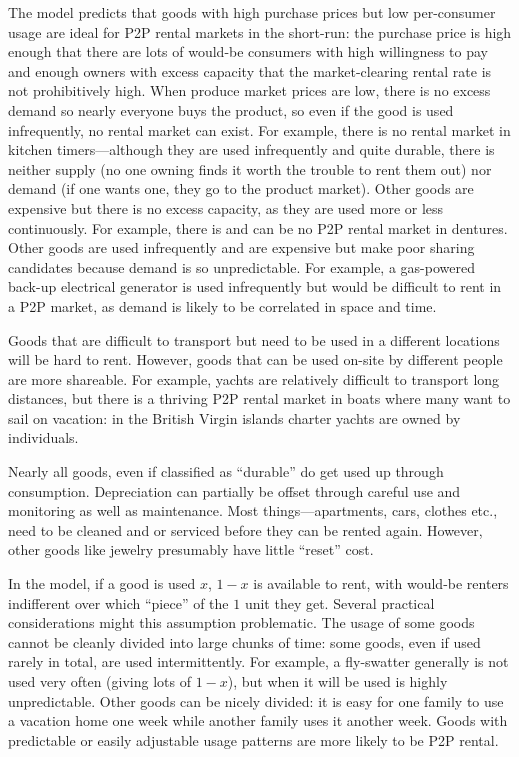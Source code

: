 \documentclass[11pt]{article}
\begin{document}
The model predicts that goods with high purchase prices but low per-consumer usage are ideal for P2P rental markets in the short-run: 
the purchase price is high enough that there are lots of would-be consumers with high willingness to pay and enough owners with excess capacity that the market-clearing rental rate is not prohibitively high. 
When produce market prices are low, there is no excess demand so nearly everyone buys the product, so even if the good is used infrequently, no rental market can exist.  
For example, there is no rental market in kitchen timers---although they are used infrequently and quite durable, there is neither supply (no one owning finds it worth the trouble to rent them out) nor demand (if one wants one, they go to the product market). 
Other goods are expensive but there is no excess capacity, as they are used more or less continuously. 
For example, there is and can be no P2P rental market in dentures. 
Other goods are used infrequently and are expensive but make poor sharing candidates because demand is so unpredictable. 
For example, a gas-powered back-up electrical generator is used infrequently but would be difficult to rent in a P2P market, as demand is likely to be correlated in space and time. 

Goods that are difficult to transport but need to be used in a different locations will be hard to rent. 
However, goods that can be used on-site by different people are more shareable. 
For example, yachts are relatively difficult to transport long distances, but there is a thriving P2P rental market in boats where many want to sail on vacation: 
in the British Virgin islands charter yachts are owned by individuals. 

Nearly all goods, even if classified as ``durable'' do get used up through consumption. 
Depreciation can partially be offset through careful use and monitoring as well as maintenance.  
Most things---apartments, cars, clothes etc., need to be cleaned and or serviced before they can be rented again. 
However, other goods like jewelry presumably have little ``reset'' cost.

In the model, if a good is used $x$, $1-x$ is available to rent, with would-be renters indifferent over which ``piece'' of the $1$ unit they get. 
Several practical considerations might this assumption problematic. 
The usage of some goods cannot be cleanly divided into large chunks of time: 
some goods, even if used rarely in total, are used intermittently. 
For example, a fly-swatter generally is not used very often (giving lots of $1-x$), but when it will be used is highly unpredictable. 
Other goods can be nicely divided: it is easy for one family to use a vacation home one week while another family uses it another week. 
Goods with predictable or easily adjustable usage patterns are more likely to be P2P rental. 
\end{document}
